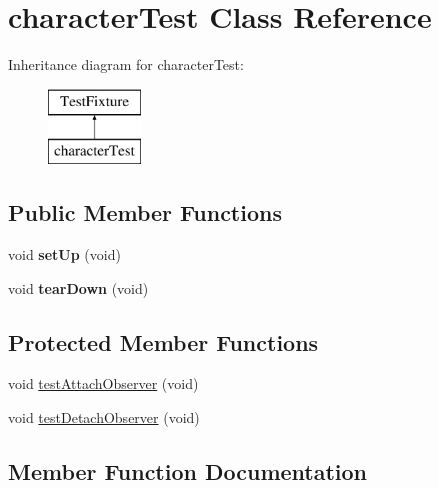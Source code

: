 \hypertarget{classcharacter_test}{}\section{character\+Test Class Reference}
\label{classcharacter_test}
Inheritance diagram for character\+Test\+:\begin{figure}[H]
\begin{center}
\leavevmode
\includegraphics[height=2.000000cm]{classcharacter_test}
\end{center}
\end{figure}
\subsection*{Public Member Functions}
\begin{DoxyCompactItemize}
\item 
\hypertarget{classcharacter_test_ae910ab7281d7742a369b6d0f2e41eb7a}{}\label{classcharacter_test_ae910ab7281d7742a369b6d0f2e41eb7a} 
void {\bfseries set\+Up} (void)
\item 
\hypertarget{classcharacter_test_a3edc2253bc653272aabb62a3caa5a6a0}{}\label{classcharacter_test_a3edc2253bc653272aabb62a3caa5a6a0} 
void {\bfseries tear\+Down} (void)
\end{DoxyCompactItemize}
\subsection*{Protected Member Functions}
\begin{DoxyCompactItemize}
\item 
void \hyperlink{classcharacter_test_a815882850aa0cf833ee91ac412cfd185}{test\+Attach\+Observer} (void)
\item 
void \hyperlink{classcharacter_test_a7afc2a1b8e1e2575d658877a86133e50}{test\+Detach\+Observer} (void)
\end{DoxyCompactItemize}


\subsection{Member Function Documentation}
\hypertarget{classcharacter_test_a815882850aa0cf833ee91ac412cfd185}{}\label{classcharacter_test_a815882850aa0cf833ee91ac412cfd185} 
